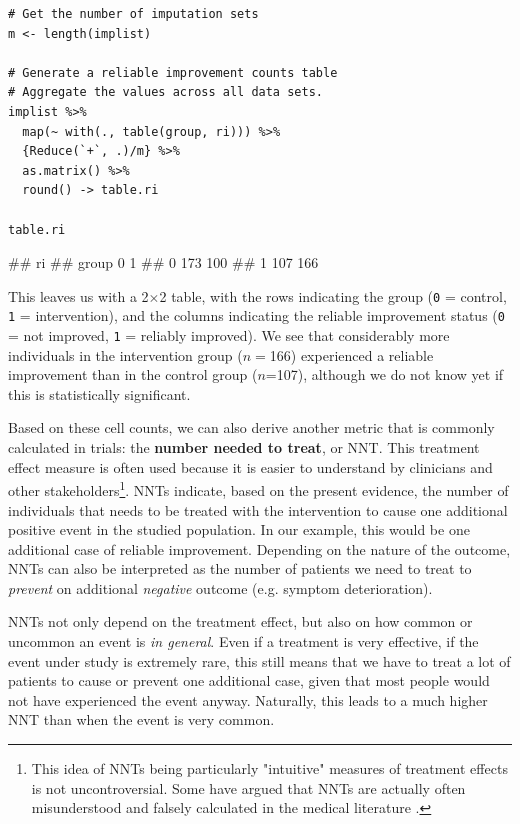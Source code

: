 \begin{lstlisting}
# Get the number of imputation sets
m <- length(implist)

# Generate a reliable improvement counts table
# Aggregate the values across all data sets.
implist %>%
  map(~ with(., table(group, ri))) %>%
  {Reduce(`+`, .)/m} %>%
  as.matrix() %>%
  round() -> table.ri

table.ri
\end{lstlisting}

\begin{example}
##      ri
## group   0   1
##     0 173 100
##     1 107 166
\end{example}

This leaves us with a 2$\times$2 table, with the rows indicating the group (\texttt{0} = control, \texttt{1} = intervention), and the columns indicating the reliable improvement status (\texttt{0} = not improved, \texttt{1} = reliably improved). We see that considerably more individuals in the intervention group ($n=$166) experienced a reliable improvement than in the control group ($n$=107), although we do not know yet if this is statistically significant. 

Based on these cell counts, we can also derive another metric that is commonly calculated in trials: the \textbf{number needed to treat}, or NNT. This treatment effect measure is often used because it is easier to understand by clinicians and other stakeholders\footnote{This idea of NNTs being particularly "intuitive" measures of treatment effects is not uncontroversial. Some have argued that NNTs are actually often misunderstood and falsely calculated in the medical literature \citep{christensen2006number, mendes2017number}.}. NNTs indicate, based on the present evidence, the number of individuals that needs to be treated with the intervention to cause one additional positive event in the studied population. In our example, this would be one additional case of reliable improvement. Depending on the nature of the outcome, NNTs can also be interpreted as the number of patients we need to treat to \emph{prevent} on additional \emph{negative} outcome (e.g. symptom deterioration). 

NNTs not only depend on the treatment effect, but also on how common or uncommon an event is \emph{in general}. Even if a treatment is very effective, if the event under study is extremely rare, this still means that we have to treat a lot of patients to cause or prevent one additional case, given that most people would not have experienced the event anyway. Naturally, this leads to a much higher NNT than when the event is very common. 


